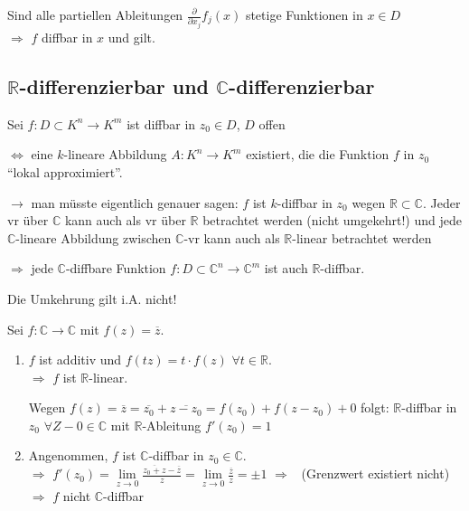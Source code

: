 \begin{boldenvironment}[Ausblick]
	Sind alle partiellen Ableitungen $\frac{\partial}{\partial x_j} f_j(x)$ stetige Funktionen in $x\in D$ \\
	$\Rightarrow$ $f$ \gls{diffbar} in $x$ und  gilt.
\end{boldenvironment}

\subsection{\texorpdfstring{$\mathbf{\mathbb{R}}$}{R}-differenzierbar und \texorpdfstring{$\mathbf{\mathbb{C}}$}{C}-differenzierbar}
Sei $f:D\subset K^n\to K^m$ ist \gls{diffbar} in $z_0 \in D$, $D$ offen

$\Leftrightarrow$ eine $k$-lineare Abbildung $A:K^n\to K^m$ existiert, die die Funktion $f$ in $z_0$ "`lokal approximiert"'.

$\rightarrow$ man müsste eigentlich genauer sagen: $f$ ist $k$-\gls{diffbar} in $z_0$ wegen $\mathbb{R}\subset\mathbb{C}$. Jeder \gls{vr} über $\mathbb{C}$ kann auch als \gls{vr} über $\mathbb{R}$ betrachtet werden (nicht umgekehrt!) und jede $\mathbb{C}$-lineare Abbildung zwischen $\mathbb{C}$-\gls{vr} kann auch als $\mathbb{R}$-linear betrachtet werden

$\Rightarrow$ jede $\mathbb{C}$-\gls{diffbar}e Funktion $f:D\subset \mathbb{C}^n\to \mathbb{C}^m$ ist auch $\mathbb{R}$-\gls{diffbar}.

Die Umkehrung gilt i.A. nicht!

\begin{example}
	Sei $f:\mathbb{C}\to\mathbb{C}$ mit $f(z) = \overline{z}$.
	\begin{enumerate}[label={\alph*)}]
		\item $f$ ist additiv und $f(tz) = t\cdot f(z)$ $\forall t\in \mathbb{R}$. \\
		$\Rightarrow$ $f$ ist $\mathbb{R}$-linear.
		
		Wegen $f(z) = \overline{z} = \overline{z_0} + \overline{z - z_0} = f(z_0) + f(z - z_0) + 0$ folgt: $\mathbb{R}$-\gls{diffbar} in $z_0$ $\forall Z-0\in\mathbb{C}$ mit $\mathbb{R}$-Ableitung $f'(z_0) = 1$
		
		\item Angenommen, $f$ ist $\mathbb{C}$-\gls{diffbar} in $z_0\in\mathbb{C}$.\\
		$\Rightarrow$ $f'(z_0) = \lim\limits_{z\to 0} \frac{\overline{z_0 + z} - \overline{z}}{z} = \lim\limits_{z\to 0} \frac{\overline{z}}{z} = \pm 1$ $\Rightarrow$ \Lightning\ (Grenzwert existiert nicht) \\
		$\Rightarrow$ $f$ nicht $\mathbb{C}$-\gls{diffbar}
	\end{enumerate}
\end{example}

